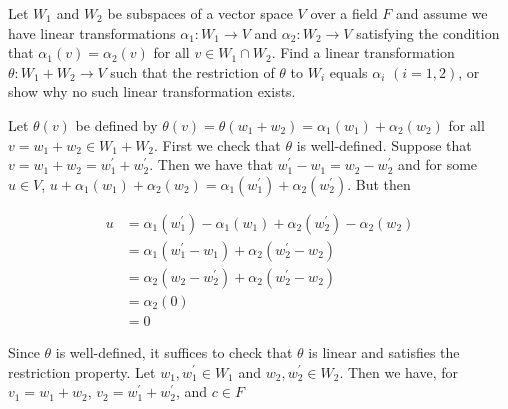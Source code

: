 \begin{problem}[Golan 241]
Let $W_1$ and $W_2$ be subspaces of a vector space $V$ over a field $F$ and assume
we have linear transformations 
$\alpha_1: W_1 \rightarrow V$ and 
$\alpha_2: W_2 \rightarrow V$ satisfying the condition that $\alpha_1(v) = \alpha_2(v)$
for all $v \in W_1 \cap W_2$.  Find a linear transformation 
$\theta: W_1 + W_2 \rightarrow V$ such that the restriction of $\theta$ to $W_i$
equals $\alpha_i$ $(i=1, 2)$, or show why no such linear transformation exists.
\end{problem}
\smallskip
\begin{solution}
Let $\theta(v)$ be defined by $\theta(v) = \theta(w_1 + w_2) = \alpha_1(w_1) + \alpha_2(w_2)$ 
for all $v = w_1 + w_2 \in W_1 + W_2$.  First we check that $\theta$ is well-defined.  Suppose 
that $v = w_1 + w_2 = w_1^{\prime} + w_2^{\prime}$.  Then we have that $w_1^{\prime} - w_1 = 
w_2 - w_2^{\prime}$ and for some $u\in V$, $u + \alpha_1(w_1) + \alpha_2(w_2) = 
\alpha_1(w_1^{\prime}) + \alpha_2(w_2^{\prime})$.  But then

\begin{align*}
u &= \alpha_1(w_1^{\prime}) - \alpha_1(w_1) + \alpha_2(w_2^{\prime}) - \alpha_2(w_2) \\
  &= \alpha_1(w_1^{\prime}-w_1) + \alpha_2(w_2^{\prime}-w_2) \\
  &= \alpha_2(w_2 - w_2^{\prime}) + \alpha_2(w_2^{\prime}-w_2) \\
  &= \alpha_2(0) \\
  &= 0
\end{align*}

Since $\theta$ is well-defined, it suffices to check that $\theta$ is linear and satisfies the restriction property.  Let $w_1,w_1^{\prime}\in W_1$ and $w_2,w_2^{\prime}\in W_2$.  Then we have, for $v_1 = w_1+w_2$, $v_2 = w_1^{\prime}+w_2^{\prime}$, and $c\in F$ 


\end{solution}
